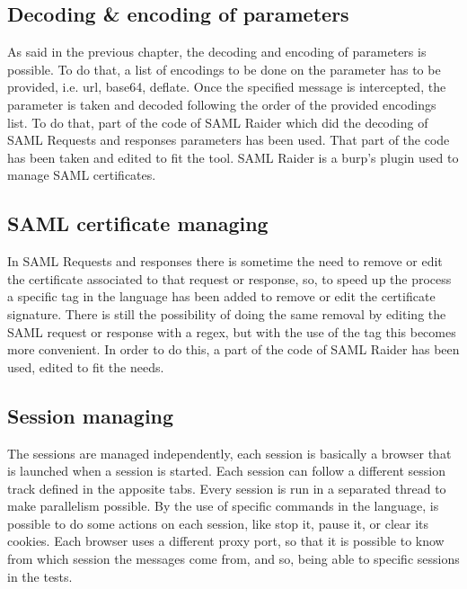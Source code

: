 \subsection{Decoding \& encoding of parameters}
As said in the previous chapter, the decoding and encoding of parameters is possible. To do that, a list of encodings to be done on the parameter has to be provided, i.e. url, base64, deflate. Once the specified message is intercepted, the parameter is taken and decoded following the order of the provided encodings list. To do that, part of the code of SAML Raider \cite{saml_raider} which did the decoding of \Gls{SAML} Requests and responses parameters has been used. That part of the code has been taken and edited to fit the tool. SAML Raider is a \Gls{burp}'s plugin used to manage \Gls{SAML} certificates.

\subsection{SAML certificate managing}
In \Gls{SAML} Requests and responses there is sometime the need to remove or edit the certificate associated to that request or response, so, to speed up the process a specific tag in the language has been added to remove or edit the certificate signature. There is still the possibility of doing the same removal by editing the \Gls{SAML} request or response with a regex, but with the use of the tag this becomes more convenient.
In order to do this, a part of the code of SAML Raider \cite{saml_raider} has been used, edited to fit the needs.

%

\subsection{Session managing}
The sessions are managed independently, each session is basically a browser that is launched when a session is started. Each session can follow a different \gls{session track} defined in the apposite tabs. Every session is run in a separated thread to make parallelism possible. By the use of specific commands in the language, is possible to do some actions on each session, like stop it, pause it, or clear its cookies. Each browser uses a different proxy port, so that it is possible to know from which session the messages come from, and so, being able to specific sessions in the tests.







